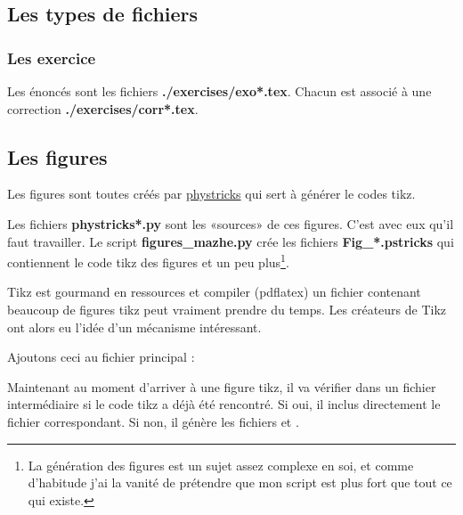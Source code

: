 \subsection{Les types de fichiers}

\subsubsection{Les exercice}

Les énoncés sont les fichiers {\bf  ./exercises/exo*.tex}. Chacun est associé à une correction {\bf ./exercises/corr*.tex}.

\subsection{Les figures}

Les figures sont toutes créés par \href{https://github.com/LaurentClaessens/phystricks}{phystricks} qui sert à générer le codes tikz.

Les fichiers {\bf phystricks*.py} sont les «sources» de ces figures. C'est avec eux qu'il faut travailler. Le script {\bf figures\_mazhe.py} crée les fichiers {\bf Fig\_*.pstricks} qui contiennent le code tikz des figures et un peu plus\footnote{La génération des figures est un sujet assez complexe en soi, et comme d'habitude j'ai la vanité de prétendre que mon script est plus fort que tout ce qui existe.}.

Tikz est gourmand en ressources et compiler (pdflatex) un fichier contenant beaucoup de figures tikz peut vraiment prendre du temps. Les créateurs de Tikz ont alors eu l'idée d'un mécanisme intéressant. 

Ajoutons ceci au fichier principal :


Maintenant au moment d'arriver à une figure tikz, il va vérifier dans un fichier intermédiaire  si le code tikz a déjà été rencontré. Si oui, il inclus directement le fichier  correspondant. Si non, il génère les fichiers  et .

